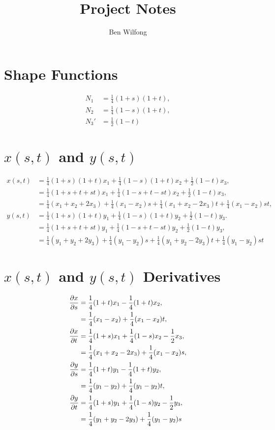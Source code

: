 \documentclass[letterpaper]{article}
\title{Project Notes}
\author{Ben Wilfong}
\numberwithin{equation}{section}
\begin{document}
	
	\maketitle
	\tableofcontents \newpage
	
	\section{Shape Functions}
	\begin{align*}
		N_1 &= \frac{1}{4}(1+s)(1+t), \\
		N_2 &= \frac{1}{4}(1-s)(1+t), \\
		N_3' &= \frac{1}{2}(1-t)
	\end{align*}
	\section{$x(s,t)$ and $y(s,t)$}
	\begin{align*}
		x(s,t) &= \frac{1}{4}(1+s)(1+t)x_1 + \frac{1}{4}(1-s)(1+t)x_2 +  \frac{1}{2}(1-t)x_3, \\
				&= \frac{1}{4}(1 + s + t + st)x_1 + \frac{1}{4}(1 - s + t - st)x_2 + \frac{1}{2}(1-t)x_3, \\
				&= \frac{1}{4}(x_1 + x_2 + 2x_3) + \frac{1}{4}(x_1 - x_2)s + \frac{1}{4}(x_1 + x_2 - 2x_3)t + \frac{1}{4}(x_1 - x_2)st, \\
		y(s,t) &= \frac{1}{4}(1+s)(1+t)y_1 + \frac{1}{4}(1-s)(1+t)y_2 +  \frac{1}{2}(1-t)y_3. \\
				&= \frac{1}{4}(1 + s + t + st)y_1 + \frac{1}{4}(1 - s + t - st)y_2 + \frac{1}{2}(1-t)y_3, \\
				&= \frac{1}{4}(y_1 + y_2 + 2y_3) + \frac{1}{4}(y_1 - y_2)s + \frac{1}{4}(y_1 + y_2 - 2y_3)t + \frac{1}{4}(y_1 - y_2)st
	\end{align*}
	\section{$x(s,t)$ and $y(s,t)$ Derivatives}
	\begin{align*}
		\pdiff[x]{s} &= \frac{1}{4}(1+t)x_1 - \frac{1}{4}(1+t)x_2, \\
			&= \frac{1}{4}(x_1 - x_2) + \frac{1}{4}(x_1 - x_2)t, \\
		\pdiff[x]{t} &= \frac{1}{4}(1+s)x_1 + \frac{1}{4}(1-s)x_2 - \frac{1}{2}x_3, \\
			&= \frac{1}{4}(x_1 + x_2 - 2x_3) + \frac{1}{4}(x_1-x_2)s, \\
		\pdiff[y]{s} &= \frac{1}{4}(1+t)y_1 - \frac{1}{4}(1+t)y_2, \\
			&= \frac{1}{4}(y_1 - y_2) + \frac{1}{4}(y_1 - y_2)t, \\
		\pdiff[y]{t} &= \frac{1}{4}(1+s)y _1 + \frac{1}{4}(1-s)y_2 - \frac{1}{2}y_3, \\
			&= \frac{1}{4}(y_1 + y_2 - 2y_3) + \frac{1}{4}(y_1-y_2)s
	\end{align*}
\end{document}
